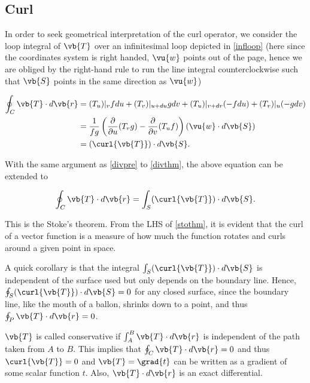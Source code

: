 \documentclass[english,a4paper,12pt]{report}
\begin{document}
\subsection{Curl}

In order to seek geometrical interpretation of the curl operator, we consider the loop integral of \(\vb{T}\) over an infinitesimal loop depicted in \cref{infloop} (here since the coordinates system is right handed, \(\vu{w}\) points out of the page, hence we are obliged by the right-hand rule to run the line integral counterclockwise such that \(\vb{S}\) points in the same direction as \(\vu{w}\))
	
\begin{equation} 
	\begin{aligned} 
		\oint_{C} \vb{T} \cdot d\vb{r} &= (T_u)|_{v}fdu + (T_v)|_{u+du}gdv + (T_u)|_{v+dv}(-fdu) + (T_v)|_{u}(-gdv) \\ &= \frac{1}{fg}\left(\frac{\partial }{\partial u} (T_{v} g) - \frac{\partial }{\partial v} (T_{u}f)\right)(\vu{w} \cdot d\vb{S}) \\ &= (\curl{\vb{T} } ) \cdot d\vb{S} . 
	\end{aligned} 
\end{equation}

With the same argument as \cref{divpre}  to \cref{divthm}, the above equation can be extended to
	
\begin{equation} 
	\oint_{C} \vb{T} \cdot d\vb{r} = \int_{S} (\curl{\vb{T}}) \cdot d\vb{S}. \label{stothm} 
\end{equation}
	
This is the Stoke's theorem. From the LHS of \cref{stothm}, it is evident that the curl of a vector function is a measure of how much the function rotates and curls around a given point in space.


A quick corollary is that the integral \(\int_{S} (\curl{\vb{T}}) \cdot d\vb{S}\) is independent of the surface used but only depends on the boundary line. Hence, \( \oint_{S} (\curl{\vb{T}}) \cdot d\vb{S} = 0\) for any closed surface, since the boundary line, like the mouth of a ballon, shrinks down to a point, and thus \(\oint_{P} \vb{T} \cdot d\vb{r} = 0\).

\(\vb{T} \) is called conservative if \(\int_{A}^{B}  \vb{T} \cdot d\vb{r}  \) is independent of the path taken from \(A\) to \(B\). This implies that \( \oint_{C} \vb{T} \cdot d\vb{r} = 0\) and thus \(\curl{\vb{T} } = 0\) and \(\vb{T} = \grad{t} \) can be written as a gradient of some scalar function \(t\). Also, \(\vb{T} \cdot d\vb{r} \) is an exact differential.      
\end{document}
